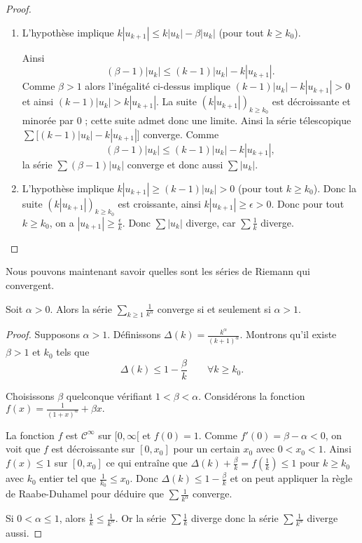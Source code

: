 \documentclass[class=report,crop=false]{standalone}
\begin{document}
\begin{proof}
\begin{enumerate}
  \item L'hypothèse implique $k|u_{k+1}| \le k|u_k| - \beta |u_k|$ (pour tout $k \ge k_0$).
  
Ainsi 
$$(\beta-1)|u_k| \le (k-1)|u_k|-k|u_{k+1}|.$$
Comme $\beta>1$ alors l'inégalité ci-dessus implique
$(k-1)|u_k|-k|u_{k+1}|>0$ et ainsi $(k-1)|u_k| > k|u_{k+1}|$.
La suite $(k |u_{k+1}|)_{k\ge k_0}$ est décroissante et minorée par $0$ ;
cette suite admet donc une limite.
Ainsi la série télescopique $\sum \big[(k-1)|u_k|-k|u_{k+1}|\big]$ converge. 
Comme 
$$(\beta-1)|u_k| \le (k-1)|u_k|-k|u_{k+1}|,$$
la série  $\sum(\beta-1)|u_k|$ converge et donc aussi $\sum |u_k|$.
  
  \item L'hypothèse implique $k|u_{k+1}| \ge (k-1)|u_k| >0$ (pour tout $k \ge k_0$).
Donc la suite $(k|u_{k+1}|)_{k \ge k_0}$ est croissante, ainsi
$k|u_{k+1}|\ge \epsilon>0$. Donc pour tout $k \ge k_0$, on a
$|u_{k+1}| \ge \frac{\epsilon}{k}$. 
Donc $\sum|u_k|$ diverge, car $\sum\frac{1}{k}$ diverge.
\end{enumerate}

\end{proof}


Nous pouvons maintenant savoir quelles sont les séries de Riemann
qui convergent.

\begin{proposition}
Soit $\alpha>0$. Alors la série $\sum_{k\ge1} \frac{1}{k^\alpha}$
converge si et seulement si $\alpha>1$.
\end{proposition}

\begin{proof}
Supposons $\alpha > 1$. 
Définissons $\Delta(k) = \frac{k^\alpha}{(k+1)^\alpha}$.
Montrons qu'il existe $\beta>1$  et $k_0$ tels que 
$$\Delta(k) \le 1-\frac{\beta}{k}  
\qquad \forall k \ge k_0.$$

Choisissons $\beta$ quelconque vérifiant $1 < \beta < \alpha$.
Considérons la fonction $f(x)= \frac{1}{(1+x)^\alpha} +\beta x.$

La fonction $f$ est $\mathcal{C}^\infty$ sur $[0,\infty[$ et 
$f(0)=1$.
Comme $f'(0)=\beta-\alpha<0$, on voit que $f$ est décroissante 
sur $[0, x_0]$ pour un certain $x_0$ avec  $0<x_0<1$.  
Ainsi $f(x)\le 1$ sur $[0,x_0]$ ce qui entraîne que
$\Delta(k)+\frac{\beta}{k}=f(\frac{1}{k}) \le 1$ pour $k \ge k_0$
avec $k_0$ entier tel que $\frac{1}{k_0} \le x_0$. Donc
$\Delta(k)\le 1-\frac{\beta}{k}$ et on peut appliquer la règle de Raabe-Duhamel pour 
déduire que $\sum \frac1{k^{\alpha}}$ converge.

\medskip

Si $0 < \alpha \le 1$, alors $\frac{1}{k} \le \frac{1}{k^\alpha}$.
Or la série $\sum \frac{1}{k}$ diverge donc la série 
$\sum\frac{1}{k^\alpha}$ diverge aussi.
\end{proof}
\end{document}
